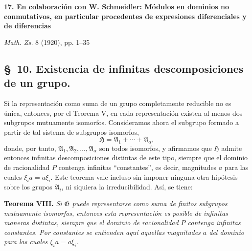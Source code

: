 
\begin{center}
{\Large\bfseries 17. En colaboración con W. Schmeidler: Módulos en dominios no conmutativos, en particular procedentes de expresiones diferenciales y de diferencias}\par
\vspace{1em}
\emph{Math. Zs.} 8 (1920), pp. 1--35
\end{center}


\setcounter{footnote}{19}
\subsection*{\S~10. Existencia de infinitas descomposiciones de un grupo.}

Si la representación como suma de un grupo completamente reducible no es única, entonces, por el Teorema V, en cada representación existen al menos dos subgrupos mutuamente isomorfos. Consideramos ahora el subgrupo formado a partir de tal sistema de subgrupos isomorfos,
\[
  \mathfrak H=\mathfrak A_1+\cdots+\mathfrak A_\alpha,
\]
donde, por tanto, $\mathfrak A_1,\mathfrak A_2,\ldots,\mathfrak A_\alpha$ son todos isomorfos, y afirmamos que $\mathfrak H$ admite entonces infinitas descomposiciones distintas de este tipo, siempre que el dominio de racionalidad $P$ contenga infinitas ``constantes'', es decir, magnitudes $a$ para las cuales $\xi_i a=a\xi_i$. Este teorema vale incluso sin imponer ninguna otra hipótesis sobre los grupos $\mathfrak A_i$, ni siquiera la irreducibilidad. Así, se tiene:

\textbf{Teorema VIII.} \emph{Si $\mathfrak G$ puede representarse como suma de finitos subgrupos mutuamente isomorfos, entonces esta representación es posible de infinitas maneras distintas, siempre que el dominio de racionalidad $P$ contenga infinitas constantes. Por constantes se entienden aquí aquellas magnitudes $a$ del dominio para las cuales $\xi_i a=a\xi_i$.}

